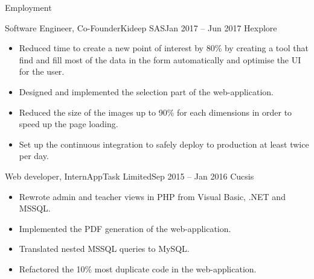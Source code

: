 \documentclass[]{mcdowellcv}
\begin{document}
	\makeheader
	
	\begin{cvsection}{Employment}
		\begin{cvsubsection}{Software Engineer, Co-Founder}{Kideep SAS}{Jan 2017 -- Jun 2017}
			Hexplore			
			\begin{itemize}
				\item Reduced time to create a new point of interest by 80\% by creating a tool that find and fill most of the data in the form automatically and optimise the UI for the user.
				\item Designed and implemented the selection part of the web-application.
				\item Reduced the size of the images up to 90\% for each dimensions in order to speed up the page loading.
				\item Set up the continuous integration to safely deploy to production at least twice per day.
			\end{itemize}
		\end{cvsubsection}
		
		\begin{cvsubsection}{Web developer, Intern}{AppTask Limited}{Sep 2015 -- Jan 2016}	
			Cucsis				
			\begin{itemize}
				\item Rewrote admin and teacher views in PHP from Visual Basic, .NET and MSSQL.
				\item Implemented the PDF generation of the web-application.
				\item Translated nested MSSQL queries to MySQL.
				\item Refactored the 10\% most duplicate code in the web-application.
			\end{itemize}
		\end{cvsubsection}
	\end{cvsection}
	
\end{document}
